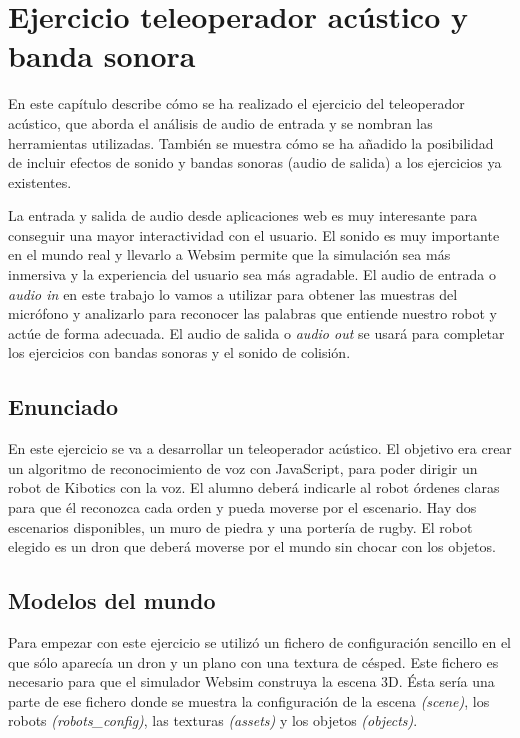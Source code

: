 \chapter{Ejercicio teleoperador acústico y banda sonora}\label{audio}
En este capítulo describe cómo se ha realizado el ejercicio del teleoperador acústico, que aborda el análisis de audio de entrada y se nombran las herramientas utilizadas. También se muestra cómo se ha añadido la posibilidad de incluir efectos de sonido y bandas sonoras (audio de salida) a los ejercicios ya existentes.

La entrada y salida de audio desde aplicaciones web es muy interesante para conseguir una mayor interactividad con el usuario. El sonido es muy importante en el mundo real y llevarlo a Websim permite que la simulación sea más inmersiva y la experiencia del usuario sea más agradable.
 El audio de entrada o \textit{audio in} en este trabajo  lo vamos a utilizar para obtener las muestras del micrófono y analizarlo  para reconocer las palabras que entiende nuestro robot y  actúe de forma adecuada. El audio de salida o \textit{audio out} se usará para completar los ejercicios con bandas sonoras y el sonido de colisión.

\section{Enunciado}  
En este ejercicio se va a desarrollar un teleoperador acústico. El objetivo era crear un algoritmo de reconocimiento de voz con JavaScript, para poder dirigir un robot de Kibotics con la voz.
El alumno deberá indicarle  al robot órdenes claras para que él reconozca cada orden  y pueda moverse por el escenario. Hay dos escenarios disponibles, un muro de piedra y una portería de rugby. El robot elegido es un dron que deberá moverse por el mundo sin chocar con los objetos.

\section{Modelos del mundo }
Para empezar con este ejercicio se utilizó un fichero de configuración sencillo en el que sólo aparecía un dron y un plano con una textura de césped. Este fichero es necesario para que el simulador Websim construya la escena 3D. 
Ésta sería una parte de ese fichero donde se muestra la configuración de la escena \textit{(scene)}, los robots \textit {(robots\_config)}, las texturas \textit{(assets)} y los objetos \textit{(objects)}.

